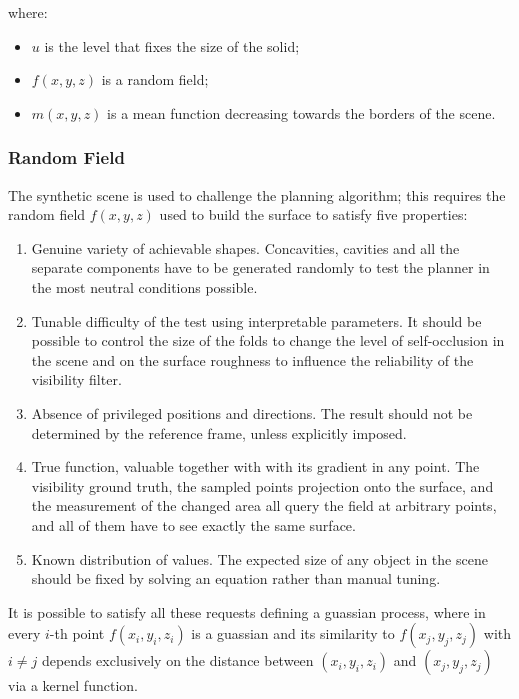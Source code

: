where:
\begin{itemize}
  \item $u$ is the level that fixes the size of the solid;
  \item $f(x,y,z)$ is a random field;
  \item $m(x,y,z)$ is a mean function decreasing towards the borders of the scene.
\end{itemize}

\subsubsection{Random Field}
The synthetic scene is used to challenge the planning algorithm; this requires the random field $f(x,y,z)$ used to build the surface to satisfy five properties:
\begin{enumerate}
  \item Genuine variety of achievable shapes. Concavities, cavities and all the separate components have to be generated randomly to test the planner in the most neutral conditions possible.
  \item Tunable difficulty of the test using interpretable parameters. It should be possible to control the size of the folds to change the level of self-occlusion in the scene and on the surface roughness to influence the reliability of the visibility filter.
  \item Absence of privileged positions and directions. The result should not be determined by the reference frame, unless explicitly imposed.
  \item True function, valuable together with with its gradient in any point. The visibility ground truth, the sampled points projection onto the surface, and the measurement of the changed area all query the field at arbitrary points, and all of them have to see exactly the same surface.
  \item Known distribution of values. The expected size of any object in the scene should be fixed by solving an equation rather than manual tuning.
\end{enumerate}

It is possible to satisfy all these requests defining a guassian process, where in every $i$-th point $f(x_i, y_i, z_i)$ is a guassian and its similarity to $f(x_j, y_j, z_j)$ with $i \neq j$ depends exclusively on the distance between $(x_i, y_i, z_i)$ and $(x_j, y_j, z_j)$ via a kernel function.
